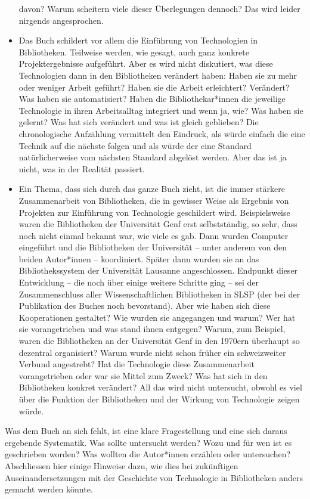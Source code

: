 \documentclass[a4paper,
fontsize=11pt,
oneside,
numbers=noperiodatend,
parskip=half-,
bibliography=totoc,
final
]{scrartcl}
\begin{document}
\begin{itemize}
  davon? Warum scheitern viele dieser Überlegungen dennoch? Das wird
  leider nirgends angesprochen.
\item
  Das Buch schildert vor allem die Einführung von Technologien in
  Bibliotheken. Teilweise werden, wie gesagt, auch ganz konkrete
  Projektergebnisse aufgeführt. Aber es wird nicht diskutiert, was diese
  Technologien dann in den Bibliotheken verändert haben: Haben sie zu
  mehr oder weniger Arbeit geführt? Haben sie die Arbeit erleichtert?
  Verändert? Was haben sie automatisiert? Haben die Bibliothekar*innen
  die jeweilige Technologie in ihren Arbeitsalltag integriert und wenn
  ja, wie? Was haben sie gelernt? Was hat sich verändert und was ist
  gleich geblieben? Die chronologische Aufzählung vermittelt den
  Eindruck, als würde einfach die eine Technik auf die nächste folgen
  und als würde der eine Standard natürlicherweise vom nächsten Standard
  abgelöst werden. Aber das ist ja nicht, was in der Realität passiert.
\item
  Ein Thema, dass sich durch das ganze Buch zieht, ist die immer
  stärkere Zusammenarbeit von Bibliotheken, die in gewisser Weise als
  Ergebnis von Projekten zur Einführung von Technologie geschildert
  wird. Beispielsweise waren die Bibliotheken der Universität Genf erst
  selbstständig, so sehr, dass noch nicht einmal bekannt war, wie viele
  es gab. Dann wurden Computer eingeführt und die Bibliotheken der
  Universität -- unter anderem von den beiden Autor*innen --
  koordiniert. Später dann wurden sie an das Bibliothekssystem der
  Universität Lausanne angeschlossen. Endpunkt dieser Entwicklung -- die
  noch über einige weitere Schritte ging -- sei der Zusammenschluss
  aller Wissenschaftlichen Bibliotheken in SLSP (der bei der Publikation
  des Buches noch bevorstand). Aber wie haben sich diese Kooperationen
  gestaltet? Wie wurden sie angegangen und warum? Wer hat sie
  vorangetrieben und was stand ihnen entgegen? Warum, zum Beispiel,
  waren die Bibliotheken an der Universität Genf in den 1970ern
  überhaupt so dezentral organisiert? Warum wurde nicht schon früher ein
  schweizweiter Verbund angestrebt? Hat die Technologie diese
  Zusammenarbeit vorangetrieben oder war sie Mittel zum Zweck? Was hat
  sich in den Bibliotheken konkret verändert? All das wird nicht
  untersucht, obwohl es viel über die Funktion der Bibliotheken und der
  Wirkung von Technologie zeigen würde.
\end{itemize}

Was dem Buch an sich fehlt, ist eine klare Fragestellung und eine sich
daraus ergebende Systematik. Was sollte untersucht werden? Wozu und für
wen ist es geschrieben worden? Was wollten die Autor*innen erzählen oder
untersuchen? Abschliessen hier einige Hinweise dazu, wie dies bei
zukünftigen Auseinandersetzungen mit der Geschichte von Technologie in
Bibliotheken anders gemacht werden könnte.
\end{document}
